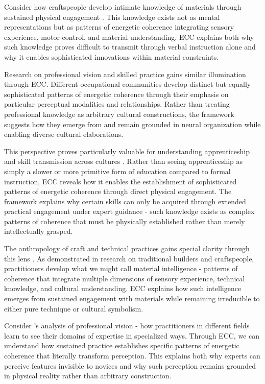 Consider how craftspeople develop intimate knowledge of materials through sustained physical engagement \cite{bunn1999nomads,marchand2010making}. This knowledge exists not as mental representations but as patterns of energetic coherence integrating sensory experience, motor control, and material understanding. ECC explains both why such knowledge proves difficult to transmit through verbal instruction alone and why it enables sophisticated innovations within material constraints.

Research on professional vision and skilled practice \cite{goodwin1994professional} gains similar illumination through ECC. Different occupational communities develop distinct but equally sophisticated patterns of energetic coherence through their emphasis on particular perceptual modalities and relationships. Rather than treating professional knowledge as arbitrary cultural constructions, the framework suggests how they emerge from and remain grounded in neural organization while enabling diverse cultural elaborations.

This perspective proves particularly valuable for understanding apprenticeship and skill transmission across cultures \cite{marchand2010making}. Rather than seeing apprenticeship as simply a slower or more primitive form of education compared to formal instruction, ECC reveals how it enables the establishment of sophisticated patterns of energetic coherence through direct physical engagement. The framework explains why certain skills can only be acquired through extended practical engagement under expert guidance - such knowledge exists as complex patterns of coherence that must be physically established rather than merely intellectually grasped.

The anthropology of craft and technical practices gains special clarity through this lens \cite{bunn1999nomads}. As demonstrated in research on traditional builders and craftspeople, practitioners develop what we might call material intelligence - patterns of coherence that integrate multiple dimensions of sensory experience, technical knowledge, and cultural understanding. ECC explains how such intelligence emerges from sustained engagement with materials while remaining irreducible to either pure technique or cultural symbolism.

Consider \cite{goodwin1994professional}'s analysis of professional vision - how practitioners in different fields learn to see their domains of expertise in specialized ways. Through ECC, we can understand how sustained practice establishes specific patterns of energetic coherence that literally transform perception. This explains both why experts can perceive features invisible to novices and why such perception remains grounded in physical reality rather than arbitrary construction.

